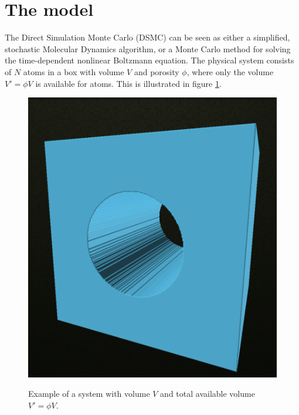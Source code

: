 \section{The model}
The Direct Simulation Monte Carlo (DSMC) can be seen as either a simplified, stochastic Molecular Dynamics algorithm, or a Monte Carlo method for solving the time-dependent nonlinear Boltzmann equation. The physical system consists of $N$ atoms in a box with volume $V$ and porosity $\phi$, where only the volume $V' = \phi V$ is available for atoms. This is illustrated in figure \ref{fig:cylinder}.
\begin{figure}[h]
\begin{center}
\includegraphics[width=\textwidth, trim=0cm 0cm 0cm 0cm, clip]{DSMC/figures/cylinder.png}
\label{fig:cylinder}
\end{center}
\caption{Example of a system with volume $V$ and total available volume $V' = \phi V$.}
\end{figure}

